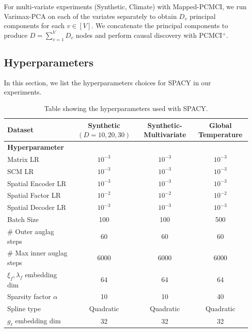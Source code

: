 For multi-variate experiments (Synthetic, Climate) with Mapped-PCMCI, we run Varimax-PCA on each of the variates separately to obtain $D_v$ principal components for each $v \in [V]$. We concatenate the principal components to produce $D = \sum_{v=1}^V D_v$ nodes and perform causal discovery with PCMCI$^+$.



\subsection{Hyperparameters}
In this section, we list the hyperparameters choices for SPACY in our experiments.
\begin{table}[H]
    \centering
    \begin{tabular}{|l|c|c|c|}
        \hline
        \textbf{Dataset} & \textbf{Synthetic} $(D=10, 20, 30)$ & \textbf{Synthetic-Multivariate} & \textbf{Global Temperature}  \\ \hline
        \textbf{Hyperparameter} & & &  \\ \hline
        Matrix LR & $10^{-3}$ & $10^{-3}$ & $10^{-3}$  \\ 
        SCM LR & $10^{-3}$ & $10^{-3}$ & $10^{-3}$  \\ 
        Spatial Encoder LR & $10^{-3}$ & $10^{-3}$ & $10^{-3}$ \\ 
        Spatial Factor LR & $10^{-2}$ & $10^{-2}$ & $10^{-2}$ \\ 
        Spatial Decoder LR & $10^{-3}$ & $10^{-3}$ & $10^{-3}$ \\ 
        Batch Size & 100 & 100 & 500 \\ 
        \# Outer auglag steps & 60 & 60 & 60 
        \\
        \# Max inner auglag steps & 6000 & 6000 & 6000 
        \\
        $\xi_f, \lambda_f$ embedding dim & 64 & 64 & 64 
        \\
        Sparsity factor $\alpha$ & 10 & 10 & 40 
        \\
        Spline type & Quadratic & Quadratic & Quadratic
        \\
        $g_\ell$ embedding dim & 32 & 32 & 32 
        \\ \hline
    \end{tabular}
    \caption{Table showing the hyperparameters used with SPACY.}
    \label{tab:hyperparameters}
\end{table}


